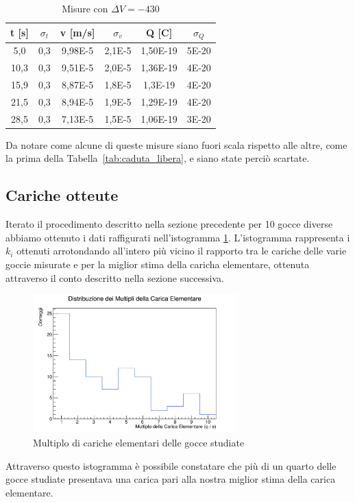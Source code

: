 \documentclass[a4paper,12pt]{article}
\begin{document}
\begin{table}[H]
    \centering
    \caption{Misure con $\Delta V = -430$}
    \label{tab:campo_elettrico_goccia_sale}
    \begin{tabular}{cccccc}
    \toprule
    \textbf{t [s]} & \textbf{$\sigma_t$} & \textbf{v [m/s]} & \textbf{$\sigma_v$} & \textbf{Q [C]} & \textbf{$\sigma_Q$} \\
    \midrule
    5,0 & 0,3 & 9,98E-5 & 2,1E-5 & 1,50E-19 & 5E-20 \\
    10,3 & 0,3 & 9,51E-5 & 2,0E-5 & 1,36E-19 & 4E-20 \\
    15,9 & 0,3 & 8,87E-5 & 1,8E-5 & 1,3E-19 & 4E-20 \\
    21,5 & 0,3 & 8,94E-5 & 1,9E-5 & 1,29E-19 & 4E-20 \\
    28,5 & 0,3 & 7,13E-5 & 1,5E-5 & 1,06E-19 & 3E-20 \\
    \bottomrule
    \end{tabular}
\end{table}

Da notare come alcune di queste misure siano fuori scala rispetto alle altre, come la prima della Tabella~\ref{tab:caduta_libera}, e siano state perciò scartate. 


\subsection{Cariche otteute}
Iterato il procedimento descritto nella sezione precedente per 10 gocce diverse abbiamo ottenuto i dati raffigurati nell'istogramma \ref{fig:Istogramma}. L'istogramma rappresenta i \(k_i\) ottenuti arrotondando all'intero più vicino il rapporto tra le cariche delle varie goccie misurate e per la miglior stima della caricha elementare, ottenuta attraverso il conto descritto nella sezione successiva.
\begin{figure}[H]
    \centering
    \includegraphics[width=0.7\textwidth]{Istogramma.png}
    \caption{Multiplo di cariche elementari delle gocce studiate}
    \label{fig:Istogramma}
\end{figure}
Attraverso questo istogramma è possibile constatare che più di un quarto delle gocce studiate presentava una carica pari alla nostra miglior stima della carica elementare.
\end{document}
